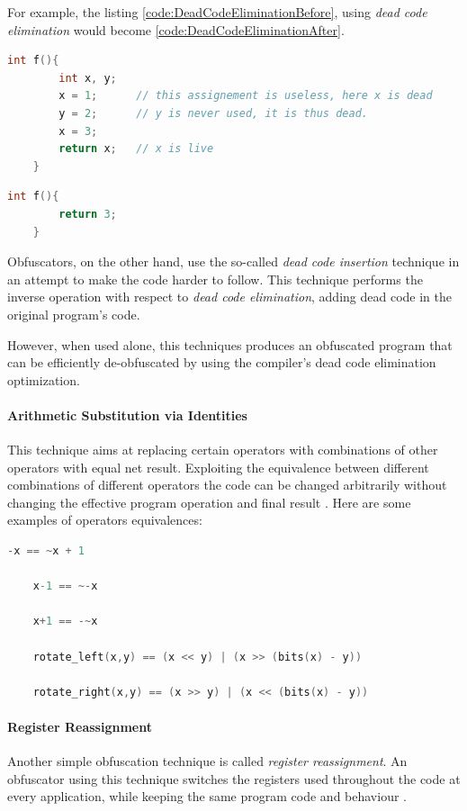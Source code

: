 \documentclass[pdfa%
,cucitura%
]{toptesi}
\begin{document}
For example, the listing \ref{code:DeadCodeEliminationBefore}, using \textit{dead code elimination} would become \ref{code:DeadCodeEliminationAfter}.
\begin{lstlisting}[caption={Before dead code elimination}, label=code:DeadCodeEliminationBefore, language=C, style=mystyle]
	int f(){
		int x, y;
		x = 1;		// this assignement is useless, here x is dead
		y = 2;		// y is never used, it is thus dead.
		x = 3;
		return x;	// x is live
	}
\end{lstlisting}

\begin{lstlisting}[caption={After dead code elimination}, label=code:DeadCodeEliminationAfter, language=C, style=mystyle]
	int f(){
		return 3;
	}
\end{lstlisting}

Obfuscators, on the other hand, use the so-called \textit{dead code insertion} technique in an attempt to make the code harder to follow. This technique performs the inverse operation with respect to \textit{dead code elimination}, adding dead code in the original program's code.

However, when used alone, this techniques produces an obfuscated program that can be efficiently de-obfuscated by using the compiler's dead code elimination optimization.

\paragraph{Arithmetic Substitution via Identities}
This technique aims at replacing certain operators with combinations of other operators with equal net result. Exploiting the equivalence between different combinations of different operators the code can be changed arbitrarily without changing the effective program operation and final result \cite{DangPRE}. Here are some examples of operators equivalences:

\begin{lstlisting}[caption={Operators equivalences}, label=code:OperatorEquivalences, language=C, style=mystyle]
	-x == ~x + 1
	
	x-1 == ~-x
	
	x+1 == -~x
	
	rotate_left(x,y) == (x << y) | (x >> (bits(x) - y))
	
	rotate_right(x,y) == (x >> y) | (x << (bits(x) - y))
\end{lstlisting}

\paragraph{Register Reassignment}
Another simple obfuscation technique is called \textit{register reassignment}. An obfuscator using this technique switches the registers used throughout the code at every application, while keeping the same program code and behaviour \cite{YouMalwareOT}.
\end{document}
